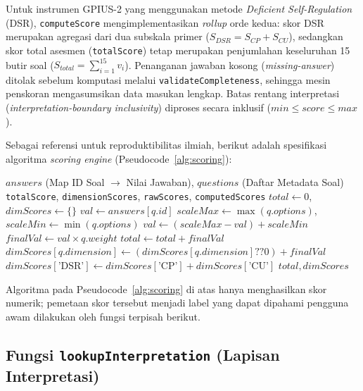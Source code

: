 Untuk instrumen GPIUS-2 yang menggunakan metode \textit{Deficient Self-Regulation} (DSR), \texttt{computeScore} mengimplementasikan \textit{rollup} orde kedua: skor DSR merupakan agregasi dari dua subskala primer ($S_{DSR} = S_{CP} + S_{CU}$), sedangkan skor total asesmen (\texttt{totalScore}) tetap merupakan penjumlahan keseluruhan 15 butir soal ($S_{total} = \sum_{i=1}^{15} v_i$). Penanganan jawaban kosong (\textit{missing-answer}) ditolak sebelum komputasi melalui \texttt{validateCompleteness}, sehingga mesin penskoran mengasumsikan data masukan lengkap. Batas rentang interpretasi (\textit{interpretation-boundary inclusivity}) diproses secara inklusif ($min \leq score \leq max$).

Sebagai referensi untuk reproduktibilitas ilmiah, berikut adalah spesifikasi algoritma \textit{scoring engine} (Pseudocode~\ref{alg:scoring}):

\begin{algorithm}[htbp]
\caption{Algoritma Komputasi Skor (\texttt{computeScore})}
\label{alg:scoring}
\begin{algorithmic}[1]
\REQUIRE $answers$ (Map ID Soal $\rightarrow$ Nilai Jawaban), $questions$ (Daftar Metadata Soal)
\ENSURE \texttt{totalScore}, \texttt{dimensionScores}, \texttt{rawScores}, \texttt{computedScores}
\STATE $total \gets 0$, $dimScores \gets \{\}$
  \STATE $val \gets answers[q.id]$
    \STATE $scaleMax \gets \max(q.options)$, $scaleMin \gets \min(q.options)$
    \STATE $val \gets (scaleMax - val) + scaleMin$
  \ENDIF
  \STATE $finalVal \gets val \times q.weight$
  \STATE $total \gets total + finalVal$
    \STATE $dimScores[q.dimension] \gets (dimScores[q.dimension] \mathbin{??} 0) + finalVal$
  \ENDIF
\ENDFOR
{}
  \STATE $dimScores[\text{'DSR'}] \gets dimScores[\text{'CP'}] + dimScores[\text{'CU'}]$
\ENDIF
\RETURN $total, dimScores$
\end{algorithmic}
\end{algorithm}

Algoritma pada Pseudocode~\ref{alg:scoring} di atas hanya menghasilkan skor numerik; pemetaan skor tersebut menjadi label yang dapat dipahami pengguna awam dilakukan oleh fungsi terpisah berikut.

\subsection{Fungsi \texttt{lookupInterpretation} (Lapisan Interpretasi)}

